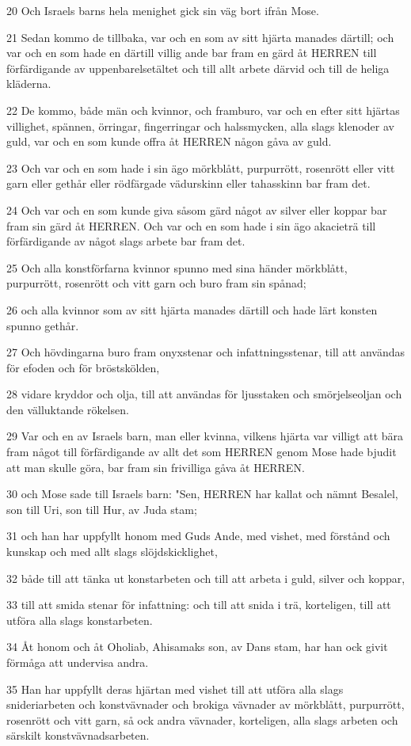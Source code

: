 \par 20 Och Israels barns hela menighet gick sin väg bort ifrån Mose.
\par 21 Sedan kommo de tillbaka, var och en som av sitt hjärta manades därtill; och var och en som hade en därtill villig ande bar fram en gärd åt HERREN till förfärdigande av uppenbarelsetältet och till allt arbete därvid och till de heliga kläderna.
\par 22 De kommo, både män och kvinnor, och framburo, var och en efter sitt hjärtas villighet, spännen, örringar, fingerringar och halssmycken, alla slags klenoder av guld, var och en som kunde offra åt HERREN någon gåva av guld.
\par 23 Och var och en som hade i sin ägo mörkblått, purpurrött, rosenrött eller vitt garn eller gethår eller rödfärgade vädurskinn eller tahasskinn bar fram det.
\par 24 Och var och en som kunde giva såsom gärd något av silver eller koppar bar fram sin gärd åt HERREN. Och var och en som hade i sin ägo akacieträ till förfärdigande av något slags arbete bar fram det.
\par 25 Och alla konstförfarna kvinnor spunno med sina händer mörkblått, purpurrött, rosenrött och vitt garn och buro fram sin spånad;
\par 26 och alla kvinnor som av sitt hjärta manades därtill och hade lärt konsten spunno gethår.
\par 27 Och hövdingarna buro fram onyxstenar och infattningsstenar, till att användas för efoden och för bröstskölden,
\par 28 vidare kryddor och olja, till att användas för ljusstaken och smörjelseoljan och den välluktande rökelsen.
\par 29 Var och en av Israels barn, man eller kvinna, vilkens hjärta var villigt att bära fram något till förfärdigande av allt det som HERREN genom Mose hade bjudit att man skulle göra, bar fram sin frivilliga gåva åt HERREN.
\par 30 och Mose sade till Israels barn: "Sen, HERREN har kallat och nämnt Besalel, son till Uri, son till Hur, av Juda stam;
\par 31 och han har uppfyllt honom med Guds Ande, med vishet, med förstånd och kunskap och med allt slags slöjdskicklighet,
\par 32 både till att tänka ut konstarbeten och till att arbeta i guld, silver och koppar,
\par 33 till att smida stenar för infattning: och till att snida i trä, korteligen, till att utföra alla slags konstarbeten.
\par 34 Åt honom och åt Oholiab, Ahisamaks son, av Dans stam, har han ock givit förmåga att undervisa andra.
\par 35 Han har uppfyllt deras hjärtan med vishet till att utföra alla slags snideriarbeten och konstvävnader och brokiga vävnader av mörkblått, purpurrött, rosenrött och vitt garn, så ock andra vävnader, korteligen, alla slags arbeten och särskilt konstvävnadsarbeten.

